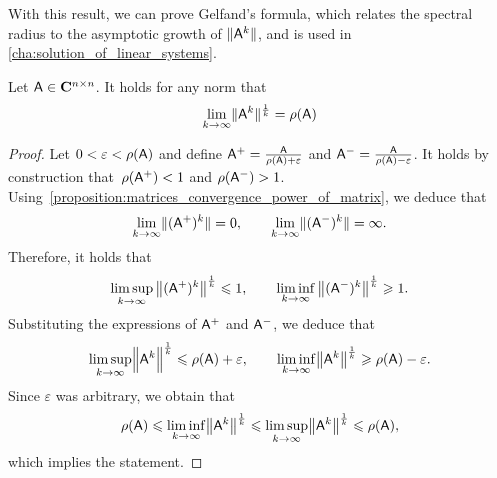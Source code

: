 With this result,
we can prove Gelfand's formula,
which relates the spectral radius to the asymptotic growth of $\lVert\mathsf A^k\rVert$,
and is used in \cref{cha:solution_of_linear_systems}.
\begin{proposition}
    \label{proposition:matrices_gelfands}
    Let $\mathsf A \in \mathbf C^{n \times n}$.
    It holds for any norm that
    \[
        \lim_{k \to \infty} \lVert\mathsf A^k\rVert^{\frac{1}{k}} = \rho(\mathsf A)
    \]
\end{proposition}
\begin{proof}
    Let $0 < \varepsilon < \rho(\mathsf A)$
    and define $\mathsf A^+ = \frac{\mathsf A}{\rho(\mathsf A) + \varepsilon}$ and $\mathsf A^- = \frac{\mathsf A}{\rho(\mathsf A) - \varepsilon}$.
    It holds by construction that~$\rho(\mathsf A^+) < 1$ and $\rho(\mathsf A^-) > 1$.
    Using~\cref{proposition:matrices_convergence_power_of_matrix}, we deduce that
    \[
        \lim_{k \to \infty} \lVert(\mathsf A^+)^k\rVert = 0, \qquad \lim_{k \to \infty} \lVert(\mathsf A^-)^k\rVert = \infty.
    \]
    Therefore, it holds that
    \[
        \limsup_{k \to \infty} \left\lVert (\mathsf A^+)^k \right\rVert^{\frac{1}{k}} \leqslant 1,
        \qquad
        \liminf_{k \to \infty} \left\lVert (\mathsf A^-)^k \right\rVert^{\frac{1}{k}} \geqslant 1.
    \]
    Substituting the expressions of $\mathsf A^+$ and $\mathsf A^-$,
    we deduce that
    \[
        \limsup_{k \to \infty} \Bigl\lVert \mathsf A^k \Bigr\rVert^{\frac{1}{k}} \leqslant \rho(\mathsf A) + \varepsilon,
        \qquad
        \liminf_{k \to \infty} \bigl\lVert \mathsf A^k \bigr\rVert^{\frac{1}{k}} \geqslant \rho(\mathsf A) - \varepsilon.
    \]
    Since $\varepsilon$ was arbitrary, we obtain that
    \[
        \rho(\mathsf A)
        \leqslant \liminf_{k \to \infty} \bigl\lVert \mathsf A^k \bigr\rVert^{\frac{1}{k}}
        \leqslant \limsup_{k \to \infty} \bigl\lVert \mathsf A^k \bigr\rVert^{\frac{1}{k}}
        \leqslant \rho(\mathsf A),
    \]
    which implies the statement.
\end{proof}
